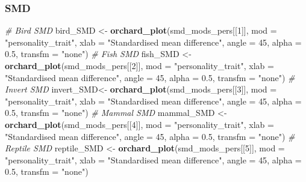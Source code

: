 \documentclass[]{article}
\newenvironment{Shaded}{\begin{snugshade}}{\end{snugshade}}
\newcommand{\KeywordTok}[1]{\textcolor[rgb]{0.13,0.29,0.53}{\textbf{#1}}}
\newcommand{\DataTypeTok}[1]{\textcolor[rgb]{0.13,0.29,0.53}{#1}}
\newcommand{\DecValTok}[1]{\textcolor[rgb]{0.00,0.00,0.81}{#1}}
\newcommand{\FloatTok}[1]{\textcolor[rgb]{0.00,0.00,0.81}{#1}}
\newcommand{\StringTok}[1]{\textcolor[rgb]{0.31,0.60,0.02}{#1}}
\newcommand{\CommentTok}[1]{\textcolor[rgb]{0.56,0.35,0.01}{\textit{#1}}}
\newcommand{\NormalTok}[1]{#1}
\begin{document}
\subsubsection{SMD}\label{smd}

\begin{Shaded}
\begin{Highlighting}[]
  \CommentTok{# Bird SMD}
\NormalTok{  bird_SMD <-}\StringTok{ }\KeywordTok{orchard_plot}\NormalTok{(smd_mods_pers[[}\DecValTok{1}\NormalTok{]], }\DataTypeTok{mod =} \StringTok{"personality_trait"}\NormalTok{, }\DataTypeTok{xlab =} \StringTok{"Standardised mean difference"}\NormalTok{, }\DataTypeTok{angle =} \DecValTok{45}\NormalTok{, }\DataTypeTok{alpha =} \FloatTok{0.5}\NormalTok{, }\DataTypeTok{transfm =} \StringTok{"none"}\NormalTok{) }
  \CommentTok{# Fish SMD}
\NormalTok{  fish_SMD <-}\StringTok{ }\KeywordTok{orchard_plot}\NormalTok{(smd_mods_pers[[}\DecValTok{2}\NormalTok{]], }\DataTypeTok{mod =} \StringTok{"personality_trait"}\NormalTok{, }\DataTypeTok{xlab =} \StringTok{"Standardised mean difference"}\NormalTok{, }\DataTypeTok{angle =} \DecValTok{45}\NormalTok{, }\DataTypeTok{alpha =} \FloatTok{0.5}\NormalTok{, }\DataTypeTok{transfm =} \StringTok{"none"}\NormalTok{)}
  \CommentTok{# Invert SMD}
\NormalTok{  invert_SMD<-}\StringTok{ }\KeywordTok{orchard_plot}\NormalTok{(smd_mods_pers[[}\DecValTok{3}\NormalTok{]], }\DataTypeTok{mod =} \StringTok{"personality_trait"}\NormalTok{, }\DataTypeTok{xlab =} \StringTok{"Standardised mean difference"}\NormalTok{, }\DataTypeTok{angle =} \DecValTok{45}\NormalTok{, }\DataTypeTok{alpha =} \FloatTok{0.5}\NormalTok{, }\DataTypeTok{transfm =} \StringTok{"none"}\NormalTok{)}
  \CommentTok{# Mammal SMD}
\NormalTok{  mammal_SMD <-}\StringTok{ }\KeywordTok{orchard_plot}\NormalTok{(smd_mods_pers[[}\DecValTok{4}\NormalTok{]], }\DataTypeTok{mod =} \StringTok{"personality_trait"}\NormalTok{, }\DataTypeTok{xlab =} \StringTok{"Standardised mean difference"}\NormalTok{, }\DataTypeTok{angle =} \DecValTok{45}\NormalTok{, }\DataTypeTok{alpha =} \FloatTok{0.5}\NormalTok{, }\DataTypeTok{transfm =} \StringTok{"none"}\NormalTok{)}
  \CommentTok{# Reptile SMD}
\NormalTok{  reptile_SMD <-}\StringTok{ }\KeywordTok{orchard_plot}\NormalTok{(smd_mods_pers[[}\DecValTok{5}\NormalTok{]], }\DataTypeTok{mod =} \StringTok{"personality_trait"}\NormalTok{, }\DataTypeTok{xlab =} \StringTok{"Standardised mean difference"}\NormalTok{, }\DataTypeTok{angle =} \DecValTok{45}\NormalTok{, }\DataTypeTok{alpha =} \FloatTok{0.5}\NormalTok{, }\DataTypeTok{transfm =} \StringTok{"none"}\NormalTok{)}
\end{Highlighting}
\end{Shaded}
\end{document}
